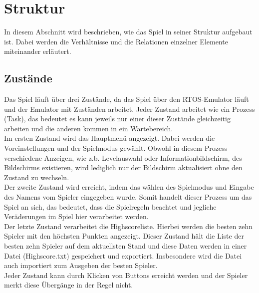 
\chapter{Struktur}
\label{Struktur}
%
In diesem Abschnitt wird beschrieben, wie das Spiel in seiner Struktur aufgebaut ist. Dabei werden die Verh{\"a}ltnisse und die Relationen einzelner Elemente miteinander erläutert. 
%

\section{Zust{\"a}nde}
\label{Zustaende}
% 
Das Spiel l{\"a}uft {\"u}ber drei Zust{\"a}nde, da das Spiel {\"u}ber den RTOS-Emulator l{\"a}uft und der Emulator mit Zust{\"a}nden arbeitet. Jeder Zustand arbeitet wie ein Prozess (Task), das bedeutet es kann jeweils nur einer dieser Zust{\"a}nde gleichzeitig arbeiten und die anderen kommen in ein Wartebereich. \\
Im ersten Zustand wird das Hauptmen{\"u} angezeigt. Dabei werden die Voreinstellungen und der Spielmodus gew{\"a}hlt. Obwohl in diesem Prozess verschiedene Anzeigen, wie z.b. Levelauswahl oder Informationbildschirm, des Bildschirms existieren, wird lediglich nur der Bildschirm aktualisiert ohne den Zustand zu wechseln. \\
Der zweite Zustand wird erreicht, indem das w{\"a}hlen des Spielmodus und Eingabe des Namens vom Spieler eingegeben wurde. Somit handelt dieser Prozess um das Spiel an sich, das bedeutet, dass die Spielregeln beachtet und jegliche Ver{\"a}derungen im Spiel hier verarbeitet werden. \\
Der letzte Zustand verarbeitet die Highscoreliste. Hierbei werden die besten zehn Spieler mit den h{\"ochsten} Punkten angezeigt. Dieser Zustand h{\"a}lt die Liste der besten zehn Spieler auf dem aktuellsten Stand und diese Daten werden in einer Datei (\glqq Highscore.txt\grqq{}) gespeichert und exportiert. Insbesondere wird die Datei auch importiert zum Ausgeben der besten Spieler. \\
Jeder Zustand kann durch Klicken von Buttons erreicht werden und der Spieler merkt diese {\"U}berg{\"a}nge in der Regel nicht.
%

%
